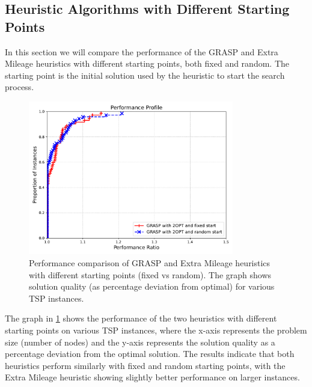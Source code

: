 \documentclass{article}
\begin{document}
\subsection{Heuristic Algorithms with Different Starting Points}
In this section we will compare the performance of the GRASP and Extra Mileage heuristics with different starting points,
both fixed and random. The starting point is the initial solution used by the heuristic to start the search process.
\begin{figure}[!ht]
	\centering
	\includegraphics[width=0.8\textwidth]{plots/fixed_vs_random_start.pdf}
	\caption{Performance comparison of GRASP and Extra Mileage heuristics with different starting points (fixed vs random). The graph shows solution quality (as percentage deviation from optimal) for various TSP instances.}
	\label{fig:grasp_vs_extra_mileage_starting_points}
\end{figure}

The graph in \ref{fig:grasp_vs_extra_mileage_starting_points} shows the performance of the two heuristics with different starting points on various TSP instances, 
where the x-axis represents the problem size (number of nodes) and the y-axis represents the solution quality as a percentage deviation from the optimal solution.
The results indicate that both heuristics perform similarly with fixed and random starting points, with the Extra Mileage heuristic showing slightly better performance on larger instances.
\end{document}
